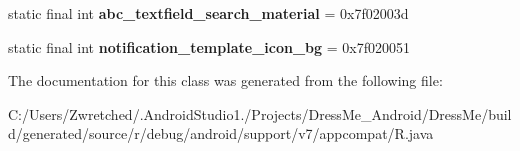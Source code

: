 \begin{DoxyCompactItemize}
\item 
\hypertarget{classandroid_1_1support_1_1v7_1_1appcompat_1_1_r_1_1drawable_ab7f05c2630051bd2d1746ef890c755fa}{}static final int {\bfseries abc\+\_\+textfield\+\_\+search\+\_\+material} = 0x7f02003d\label{classandroid_1_1support_1_1v7_1_1appcompat_1_1_r_1_1drawable_ab7f05c2630051bd2d1746ef890c755fa}

\item 
\hypertarget{classandroid_1_1support_1_1v7_1_1appcompat_1_1_r_1_1drawable_a418857631140eaea9a0ba11fa60ab72e}{}static final int {\bfseries notification\+\_\+template\+\_\+icon\+\_\+bg} = 0x7f020051\label{classandroid_1_1support_1_1v7_1_1appcompat_1_1_r_1_1drawable_a418857631140eaea9a0ba11fa60ab72e}

\end{DoxyCompactItemize}


The documentation for this class was generated from the following file\+:\begin{DoxyCompactItemize}
\item 
C\+:/\+Users/\+Zwretched/.\+Android\+Studio1./\+Projects/\+Dress\+Me\+\_\+\+Android/\+Dress\+Me/build/generated/source/r/debug/android/support/v7/appcompat/R.\+java\end{DoxyCompactItemize}
